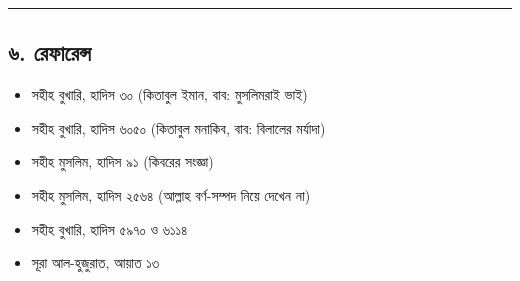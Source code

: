 \medskip\hrule\medskip

\subsection*{৬. রেফারেন্স}

\begin{itemize}
\item সহীহ বুখারি, হাদিস ৩০ (কিতাবুল ইমান, বাব: মুসলিমরাই ভাই)
\item সহীহ বুখারি, হাদিস ৬০৫০ (কিতাবুল মনাকিব, বাব: বিলালের মর্যাদা)
\item সহীহ মুসলিম, হাদিস ৯১ (কিবরের সংজ্ঞা)
\item সহীহ মুসলিম, হাদিস ২৫৬৪ (আল্লাহ বর্ণ-সম্পদ নিয়ে দেখেন না)
\item সহীহ বুখারি, হাদিস ৫৯৭০ ও ৬১১৪
\item সূরা আল-হুজুরাত, আয়াত ১৩
\end{itemize}


